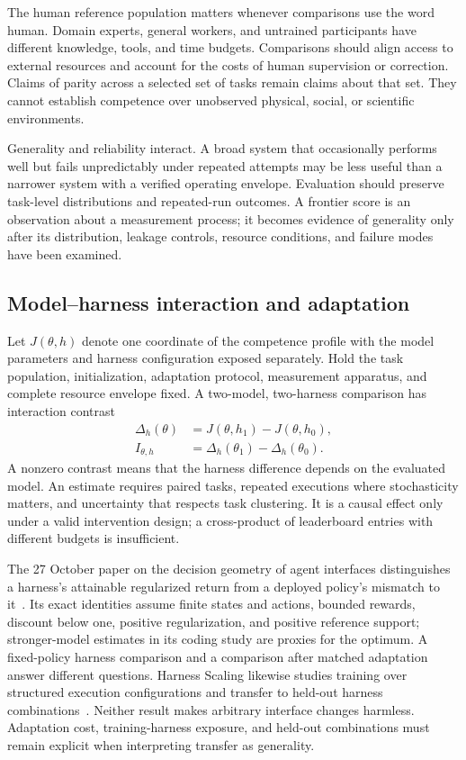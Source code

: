 The human reference population matters whenever comparisons use the word human. Domain experts, general workers, and untrained participants have different knowledge, tools, and time budgets. Comparisons should align access to external resources and account for the costs of human supervision or correction. Claims of parity across a selected set of tasks remain claims about that set. They cannot establish competence over unobserved physical, social, or scientific environments.

Generality and reliability interact. A broad system that occasionally performs well but fails unpredictably under repeated attempts may be less useful than a narrower system with a verified operating envelope. Evaluation should preserve task-level distributions and repeated-run outcomes. A frontier score is an observation about a measurement process; it becomes evidence of generality only after its distribution, leakage controls, resource conditions, and failure modes have been examined.

\subsection{Model--harness interaction and adaptation}\label{sec:C01:interaction}
Let $J(\theta,h)$ denote one coordinate of the competence profile with the model parameters and harness configuration exposed separately. Hold the task population, initialization, adaptation protocol, measurement apparatus, and complete resource envelope fixed. A two-model, two-harness comparison has interaction contrast
\begin{equation}
\begin{aligned}
 \Delta_h(\theta)&=J(\theta,h_1)-J(\theta,h_0),\\
 I_{\theta,h}&=\Delta_h(\theta_1)-\Delta_h(\theta_0).
\end{aligned}
\label{eq:C01:interaction}
\end{equation}
A nonzero contrast means that the harness difference depends on the evaluated model. An estimate requires paired tasks, repeated executions where stochasticity matters, and uncertainty that respects task clustering. It is a causal effect only under a valid intervention design; a cross-product of leaderboard entries with different budgets is insufficient.

The 27 October paper on the decision geometry of agent interfaces distinguishes a harness's attainable regularized return from a deployed policy's mismatch to it~\cite{ch01_harnessgeometry2026}. Its exact identities assume finite states and actions, bounded rewards, discount below one, positive regularization, and positive reference support; stronger-model estimates in its coding study are proxies for the optimum. A fixed-policy harness comparison and a comparison after matched adaptation answer different questions. Harness Scaling likewise studies training over structured execution configurations and transfer to held-out harness combinations~\cite{ch01_harnessscaling2026}. Neither result makes arbitrary interface changes harmless. Adaptation cost, training-harness exposure, and held-out combinations must remain explicit when interpreting transfer as generality.

